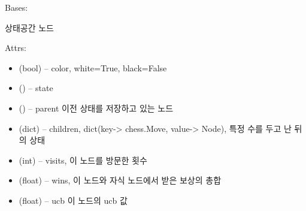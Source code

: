 \documentclass[letterpaper,10pt,english]{sphinxmanual}
\begin{document}
\begin{fulllineitems}
\label{\detokenize{agents.search:agents.search.mcts_agent.Node}}
Bases: 

상태공간 노드

Attrs:
\begin{itemize}
\item {} 
(bool) -- color, white=True, black=False

\item {} 
({\hyperref[\detokenize{scripts:scripts.run_game.State}]{}}) -- state

\item {} 
() -- parent 이전 상태를 저장하고 있는 노드

\item {} 
(dict) -- children, dict(key-\textgreater{} chess.Move, value-\textgreater{} Node), 특정 수를 두고 난 뒤의 상태

\item {} 
(int) -- visits, 이 노드를 방문한 횟수

\item {} 
(float) -- wins, 이 노드와 자식 노드에서 받은 보상의 총합

\item {} 
(float) -- ucb 이 노드의 ucb 값

\end{itemize}

\begin{fulllineitems}
\label{\detokenize{agents.search:agents.search.mcts_agent.Node.children}}
\end{fulllineitems}


\begin{fulllineitems}
\label{\detokenize{agents.search:agents.search.mcts_agent.Node.key}}
\end{fulllineitems}



\end{fulllineitems}
\end{document}
